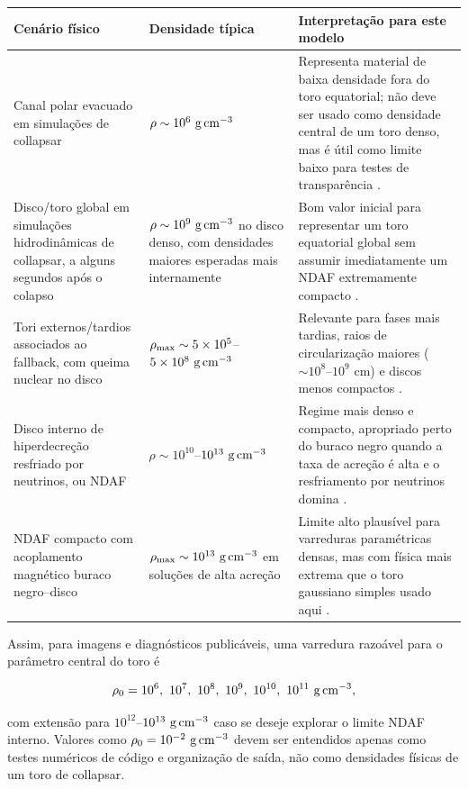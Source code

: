 \documentclass[11pt,a4paper]{article}
\begin{document}
\begin{longtable}{p{4.4cm}p{4.0cm}p{6.0cm}}
\toprule
Cenário físico & Densidade típica & Interpretação para este modelo\\
\midrule
\endhead
Canal polar evacuado em simulações de collapsar &
$\rho \sim 10^6\ {\rm g\,cm^{-3}}$ &
Representa material de baixa densidade fora do toro equatorial; não deve ser
usado como densidade central de um toro denso, mas é útil como limite baixo
para testes de transparência \cite{MacFadyenWoosley1999Web}.\\
Disco/toro global em simulações hidrodinâmicas de collapsar, a alguns
segundos após o colapso &
$\rho \sim 10^9\ {\rm g\,cm^{-3}}$ no disco denso, com densidades maiores
esperadas mais internamente &
Bom valor inicial para representar um toro equatorial global sem assumir
imediatamente um NDAF extremamente compacto \cite{MacFadyenWoosley1999,
MacFadyenWoosley1999Web}.\\
Tori externos/tardios associados ao fallback, com queima nuclear no disco &
$\rho_{\rm max}\sim 5\times 10^5$--$5\times 10^8\ {\rm g\,cm^{-3}}$ &
Relevante para fases mais tardias, raios de circularização maiores
($\sim 10^8$--$10^9$ cm) e discos menos compactos
\cite{ZenatiSiegelMetzger2020}.\\
Disco interno de hiperdecreção resfriado por neutrinos, ou NDAF &
$\rho \sim 10^{10}$--$10^{13}\ {\rm g\,cm^{-3}}$ &
Regime mais denso e compacto, apropriado perto do buraco negro quando a taxa
de acreção é alta e o resfriamento por neutrinos domina \cite{LiuGuZhang2017}.\\
NDAF compacto com acoplamento magnético buraco negro--disco &
$\rho_{\rm max}\sim 10^{13}\ {\rm g\,cm^{-3}}$ em soluções de alta acreção &
Limite alto plausível para varreduras paramétricas densas, mas com física
mais extrema que o toro gaussiano simples usado aqui \cite{SheLiuXue2022}.\\
\bottomrule
\end{longtable}

Assim, para imagens e diagnósticos publicáveis, uma varredura razoável para
o parâmetro central do toro é

\begin{equation}
  \rho_0 =
  10^6,\ 10^7,\ 10^8,\ 10^9,\ 10^{10},\ 10^{11}
  \ {\rm g\,cm^{-3}},
\end{equation}

com extensão para $10^{12}$--$10^{13}\ {\rm g\,cm^{-3}}$ caso se deseje
explorar o limite NDAF interno. Valores como $\rho_0=10^{-2}\ {\rm g\,cm^{-3}}$
devem ser entendidos apenas como testes numéricos de código e organização de
saída, não como densidades físicas de um toro de collapsar.
\end{document}
